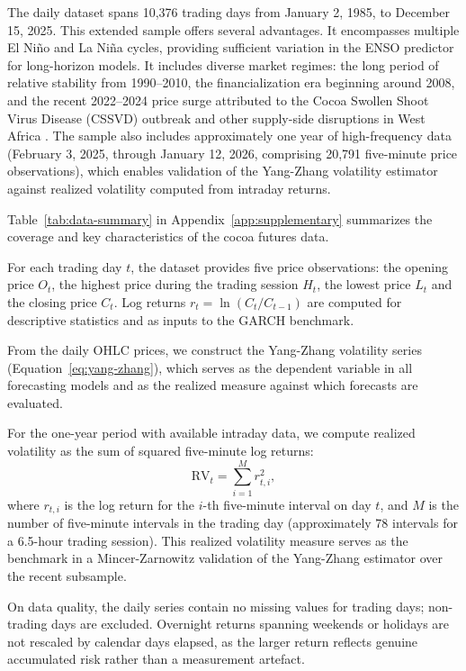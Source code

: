 The daily dataset spans 10,376 trading days from January 2, 1985, to
December 15, 2025. This extended sample offers several advantages. It
encompasses multiple El Niño and La Niña cycles, providing sufficient
variation in the ENSO predictor for long-horizon models. It includes
diverse market regimes: the long period of relative stability from
1990--2010, the financialization era beginning around 2008, and the recent
2022--2024 price surge attributed to the Cocoa Swollen Shoot Virus Disease
(CSSVD) outbreak and other supply-side disruptions in West Africa 
\parencite{ifpriSoaringCocoaPrices2024, iccoCocoaMarketReportMarch2024}. The sample also includes approximately one year of
high-frequency data (February 3, 2025, through January 12, 2026, comprising
20,791 five-minute price observations), which enables validation of the
Yang-Zhang volatility estimator against realized volatility computed from
intraday returns.

Table~\ref{tab:data-summary} in Appendix~\ref{app:supplementary} summarizes
the coverage and key characteristics of the cocoa futures data.

For each trading day $t$, the dataset provides five price observations:
the opening price $O_t$, the highest price during the trading session $H_t$,
the lowest price $L_t$ and the closing price $C_t$.
Log returns $r_t = \ln(C_t / C_{t-1})$ are computed for descriptive
statistics and as inputs to the GARCH benchmark.

From the daily OHLC prices, we construct the Yang-Zhang volatility series
(Equation~\eqref{eq:yang-zhang}), which serves as the dependent variable
in all forecasting models and as the realized measure against which forecasts
are evaluated.

For the one-year period with available intraday data, we compute realized
volatility as the sum of squared five-minute log returns:
\begin{equation}
\label{eq:realized-vol}
\text{RV}_t = \sum_{i=1}^{M} r_{t,i}^2,
\end{equation}
where $r_{t,i}$ is the log return for the $i$-th five-minute interval on
day $t$, and $M$ is the number of five-minute intervals in the trading day
(approximately 78 intervals for a 6.5-hour trading session). This realized
volatility measure serves as the benchmark in a Mincer-Zarnowitz
validation of the Yang-Zhang estimator over the recent subsample.

On data quality, the daily series contain no missing values for trading days; non-trading days are excluded. Overnight returns spanning weekends or holidays are
not rescaled by calendar days elapsed, as the larger return reflects
genuine accumulated risk rather than a measurement artefact.


